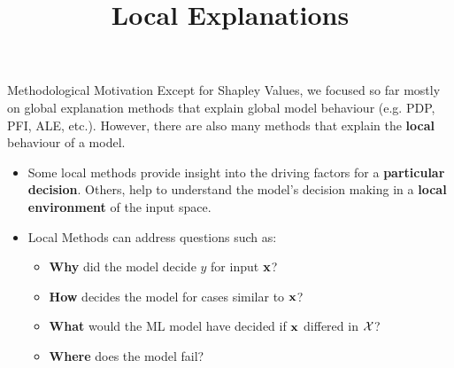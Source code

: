 \documentclass[11pt,compress,t,notes=noshow, xcolor=table]{beamer}
\title{Local Explanations}
\institute{\href{https://compstat-lmu.github.io/lecture_i2ml/}{compstat-lmu.github.io/lecture\_i2ml}}
\date{}
\begin{document}









\begin{vbframe}{Methodological Motivation}
Except for Shapley Values, we focused so far mostly on global explanation methods that explain global model behaviour (e.g. PDP, PFI, ALE, etc.). However, there are also many methods that explain the \textbf{local} behaviour of a model.
	\begin{itemize}
		\item Some local methods provide insight into the driving factors for a \textbf{particular decision}. Others, help to understand the model's decision making in a \textbf{local environment} of the input space.
		\item Local Methods can address questions such as: 
		\begin{itemize}
		    \item \textbf{Why} did the model decide $y$ for input $\xv$?
		    \item \textbf{How} decides the model for cases similar to $\xv$?
		    \item \textbf{What} would the ML model have decided if $\xv$ differed in $\Xspace$?
		    \item  \textbf{Where} does the model fail?
		\end{itemize}  
	\end{itemize}
\end{vbframe}
\end{document}
